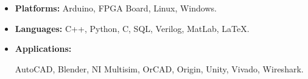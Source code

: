 \begin{itemize}
    \item 
    \textbf{Platforms:} Arduino, FPGA Board, Linux, Windows.
    \item 
    \textbf{Languages:} C++, Python, C, SQL, Verilog, MatLab, \LaTeX.
    \item 
    \textbf{Applications:} 
    \begin{minipage}[t]{\skillwidth}
        AutoCAD, Blender, NI Multisim, OrCAD, Origin, 
        Unity, Vivado, Wireshark.
    \end{minipage}
\end{itemize}
